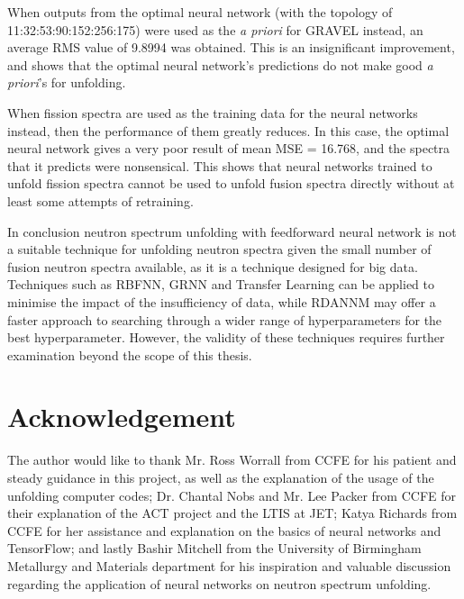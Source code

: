 \documentclass[a4paper, 12pt]{article}
\begin{document}
    When outputs from the optimal neural network (with the topology of 11:32:53:90:152:256:175) were used as the \emph{a priori} for GRAVEL instead, an average RMS value of 9.8994 was obtained. This is an insignificant improvement, and shows that the optimal neural network's predictions do not make good \emph{a priori}'s for unfolding.

    When fission spectra are used as the training data for the neural networks instead, then the performance of them greatly reduces. In this case, the optimal neural network gives a very poor result of mean MSE = 16.768, and the spectra that it predicts were nonsensical. This shows that neural networks trained to unfold fission spectra cannot be used to unfold fusion spectra directly without at least some attempts of retraining.

    In conclusion neutron spectrum unfolding with feedforward neural network is not a suitable technique for unfolding neutron spectra given the small number of fusion neutron spectra available, as it is a technique designed for big data. Techniques such as RBFNN, GRNN and Transfer Learning can be applied to minimise the impact of the insufficiency of data, while RDANNM may offer a faster approach to searching through a wider range of hyperparameters for the best hyperparameter. However, the validity of these techniques requires further examination beyond the scope of this thesis.


\section{Acknowledgement}
    The author would like to thank Mr. Ross Worrall from CCFE for his patient and steady guidance in this project, as well as the explanation of the usage of the unfolding computer codes; Dr. Chantal Nobs and Mr. Lee Packer from CCFE for their explanation of the ACT project and the LTIS at JET; Katya Richards from CCFE for her assistance and explanation on the basics of neural networks and TensorFlow; and lastly Bashir Mitchell from the University of Birmingham Metallurgy and Materials department for his inspiration and valuable discussion regarding the application of neural networks on neutron spectrum unfolding.



\end{document}
